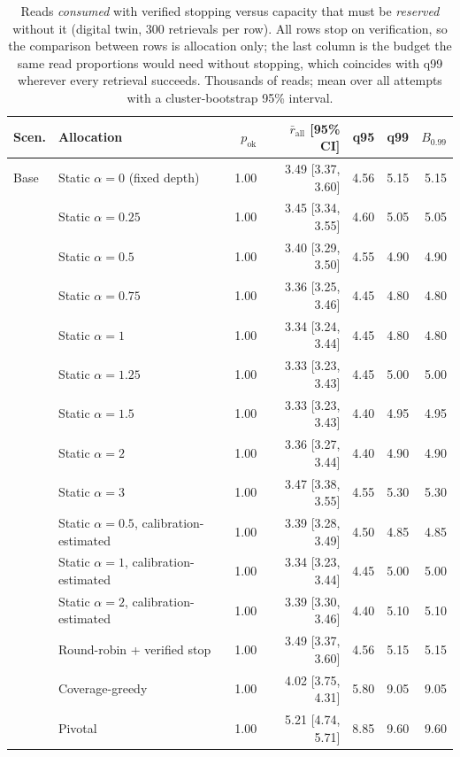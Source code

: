 \begin{table}[!t]
\centering
\caption{Reads \emph{consumed} with verified stopping versus capacity that must be \emph{reserved} without it (digital twin, 300 retrievals per row).  All rows stop on verification, so the comparison between rows is allocation only; the last column is the budget the same read proportions would need without stopping, which coincides with q99 wherever every retrieval succeeds.  Thousands of reads; mean over all attempts with a cluster-bootstrap 95\% interval.}
\label{tab:actual}
\scriptsize
\setlength{\tabcolsep}{3pt}
\begin{tabular}{@{}llrrrrr@{}}
\toprule
Scen. & Allocation & $p_{\text{ok}}$ & $\bar r_{\text{all}}$ [95\% CI] & q95 & q99 & $B_{0.99}$ \\
\midrule
Base & Static $\alpha{=}0$ (fixed depth) & 1.00 & 3.49 [3.37, 3.60] & 4.56 & 5.15 & 5.15 \\
 & Static $\alpha{=}0.25$ & 1.00 & 3.45 [3.34, 3.55] & 4.60 & 5.05 & 5.05 \\
 & Static $\alpha{=}0.5$ & 1.00 & 3.40 [3.29, 3.50] & 4.55 & 4.90 & 4.90 \\
 & Static $\alpha{=}0.75$ & 1.00 & 3.36 [3.25, 3.46] & 4.45 & 4.80 & 4.80 \\
 & Static $\alpha{=}1$ & 1.00 & 3.34 [3.24, 3.44] & 4.45 & 4.80 & 4.80 \\
 & Static $\alpha{=}1.25$ & 1.00 & 3.33 [3.23, 3.43] & 4.45 & 5.00 & 5.00 \\
 & Static $\alpha{=}1.5$ & 1.00 & 3.33 [3.23, 3.43] & 4.40 & 4.95 & 4.95 \\
 & Static $\alpha{=}2$ & 1.00 & 3.36 [3.27, 3.44] & 4.40 & 4.90 & 4.90 \\
 & Static $\alpha{=}3$ & 1.00 & 3.47 [3.38, 3.55] & 4.55 & 5.30 & 5.30 \\
 & Static $\alpha{=}0.5$, calibration-estimated & 1.00 & 3.39 [3.28, 3.49] & 4.50 & 4.85 & 4.85 \\
 & Static $\alpha{=}1$, calibration-estimated & 1.00 & 3.34 [3.23, 3.44] & 4.45 & 5.00 & 5.00 \\
 & Static $\alpha{=}2$, calibration-estimated & 1.00 & 3.39 [3.30, 3.46] & 4.40 & 5.10 & 5.10 \\
 & Round-robin + verified stop & 1.00 & 3.49 [3.37, 3.60] & 4.56 & 5.15 & 5.15 \\
 & Coverage-greedy & 1.00 & 4.02 [3.75, 4.31] & 5.80 & 9.05 & 9.05 \\
 & Pivotal & 1.00 & 5.21 [4.74, 5.71] & 8.85 & 9.60 & 9.60 \\

\end{tabular}
\end{table}
